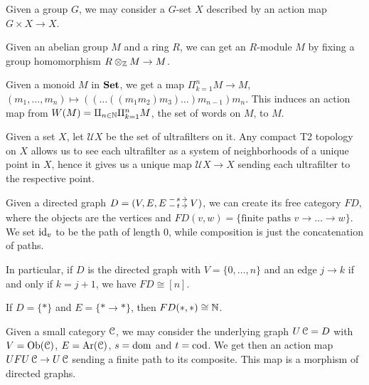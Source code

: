 \documentclass[a4paper,11pt,oneside,openany]{scrbook}
\begin{document}
\begin{exmp}
	Given a group $G$, we may consider a $G$-set $X$ described by an action map $G\times X\rightarrow X$.
\end{exmp}
\begin{exmp}
	Given an abelian group $M$ and a ring $R$, we can get an $R$-module $M$ by fixing a group homomorphism $R\otimes_{\operatorname{\mathbb{Z}}} M\rightarrow M$.
\end{exmp}
\begin{exmp}
	Given a monoid $M$ in ${\normalfont\textbf{Set}}$, we get a map $\Pi_{k=1}^n M\rightarrow M$, $(m_1,\ldots,m_n)\mapsto ((\ldots ((m_1m_2)m_3)\ldots )m_{n-1}) m_n$. This induces an action map from $W(M)=\amalg_{n\in\operatorname{\mathbb{N}}}\Pi_{k=1}^n M$, the set of words on $M$, to $M$.
\end{exmp}
\begin{exmp}\label{ultrafilters}
	Given a set $X$, let $\mathcal{U}X$ be the set of ultrafilters on it. Any compact T2 topology on $X$ allows us to see each ultrafilter as a system of neighborhoods of a unique point in $X$, hence it gives us a unique map $\mathcal{U}X\rightarrow X$ sending each ultrafilter to the respective point.
\end{exmp}
\begin{exmp}
	Given a directed graph $D=(V,E,\hspace{-1.5mm}\begin{tikzcd}
			E\hspace{-1.5mm}\arrow[r, "t" description,  shift right=.5ex, shorten <= .3em, shorten >= .3em]  \arrow[r, "s" description, shift left=1ex, shorten <= .3em, shorten >= .3em] & \hspace{-1.5mm}V
		\end{tikzcd}\hspace{-1.5mm})$, we can create its free category $FD$, where the objects are the vertices and $FD(v,w)=\{\text{finite paths } v\rightarrow\ldots\rightarrow w\}$. We set $\operatorname{id}_v$ to be the path of length 0, while composition is just the concatenation of paths.

	In particular, if $D$ is the directed graph with $V=\{0,\ldots,n\}$ and an edge $j\rightarrow k$ if and only if $k=j+1$, we have $FD\cong [n]$.

	If $D=\{*\}$ and $E=\{*\rightarrow *\}$, then $FD(*,*)\cong\operatorname{\mathbb{N}}$.

	Given a small category $\operatorname{\mathcal{C}}$, we may consider the underlying graph $U\operatorname{\mathcal{C}}=D$ with $V=\operatorname{Ob}(\operatorname{\mathcal{C}})$, $E=\operatorname{Ar}(\operatorname{\mathcal{C}})$, $s=\operatorname{dom}$ and $t=\operatorname{cod}$. We get then an action map $UFU\operatorname{\mathcal{C}}\rightarrow U\operatorname{\mathcal{C}}$ sending a finite path to its composite. This map is a morphism of directed graphs.
\end{exmp}
\end{document}
